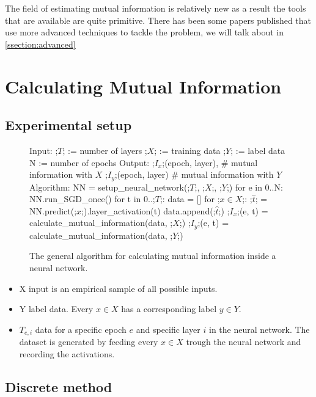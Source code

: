 The field of estimating mutual information is relatively new as a result the
tools that are available are quite primitive. There has been some papers
published that use more advanced techniques to tackle the problem, we will talk
about in \autoref{ssection:advanced}

\section{Calculating Mutual Information}

\subsection{Experimental setup}

\begin{figure}[h]
    \begin{pythonfigure}
      Input:
      ;$T$; := number of layers
      ;$X$; := training data
      ;$Y$; := label data
      N := number of epochs
      Output: 
      ;$I_x$;(epoch, layer), # mutual information with $X$ 
      ;$I_y$;(epoch, layer)  # mutual information with $Y$ 
      Algorithm:
      NN = setup_neural_network(;$T$;, ;$X$;, ;$Y$;)
      for e in 0..N:
        NN.run_SGD_once()
        for t in 0..;$T$;:
          data = []
          for ;$x \in X$;:
            ;$\hat{t}$; = NN.predict(;$x$;).layer_activation(t)
            data.append(;$\hat{t}$;)
          ;$I_x$;(e, t) = calculate_mutual_information(data, ;$X$;)
          ;$I_y$;(e, t) = calculate_mutual_information(data, ;$Y$;)
    \end{pythonfigure}
    \caption{The general algorithm for calculating mutual information inside a
    neural network.}
    \label{fig:general}
\end{figure}

\begin{itemize}
  \item{
      X input is an empirical sample of all possible inputs.
    }
  \item{
      Y label data. Every $x \in X$ has a corresponding label $y \in Y$. 
    }
  \item{
      $T_{e,i}$ data for a specific epoch $e$ and specific layer $i$ in the
      neural network. The dataset is  generated by feeding every $x \in X$
      trough the neural network and recording the activations.
    }
\end{itemize}

\newpage

\subsection{Discrete method} 

